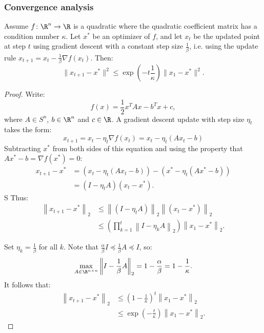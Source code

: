 \subsubsection{Convergence analysis}

\begin{theorem}
Assume $f\colon\R^n\to\R$ is a quadratic where the quadratic coefficient matrix has a condition number $\kappa$. Let $x^{*}$ be an optimizer of $f$, and let $x_{t}$ be the updated point at step $t$ using gradient descent with a constant step size $\frac{1}{\beta}$, i.e. using the update rule $x_{t+1} = x_t - \frac{1}{\beta}\nabla f(x_t)$. Then:
\begin{equation*}
\|x_{t+1} - x^*\|^2 \leq \exp\left(-t \frac{1}{\kappa}\right)\|x_1 - x^*\|^2.
\end{equation*}
\end{theorem}
\begin{proof}
Write:
\[
f(x) = \frac{1}{2}x^T A x - b^T x + c,
\]
where $A \in S^n$, $b \in \R^n$ and $c \in \R$. A gradient descent update with step size $\eta_t$ takes the form:
\[
x_{t+1} = x_t - \eta_t \nabla f(x_t) = x_t - \eta_t \left(Ax_t - b\right)
\]
Subtracting $x^*$ from both sides of this equation and using the property that $Ax^* - b = \nabla f(x^*) = 0$:
\begin{align*}
x_{t+1} - x^* &= \left(x_t - \eta_t\left(Ax_t - b\right)\right) - \left(x^* - \eta_t\left(Ax^* - b\right)\right) \\
&= (I - \eta_t A)(x_t - x^*).
\end{align*}S
Thus:
\begin{align*}
\left\|x_{t+1} - x^*\right\|_2 &\leq \left\|(I - \eta_t A)\right\|_2 \left\|(x_t - x^*)\right\|_2 \\
&\leq \left(\prod_{k=1}^t \left\| I - \eta_k A\right\|_2\right) \left\|x_1 - x^*\right\|_2.
\end{align*}

Set $\eta_k = \frac{1}{\beta}$ for all $k$. Note that $\frac{\alpha}{\beta}I \preceq \frac{1}{\beta}A \preceq I$, so:
\begin{equation*}
\max_{A \in \R^{n\times n}} \left\|I - \frac{1}{\beta} A\right \|_2 = 1 - \frac{\alpha}{\beta} = 1 - \frac{1}{\kappa}.
\end{equation*}
It follows that:
\begin{align*}
\left\|x_{t+1} - x^*\right\|_2 &\leq \left(1 - \frac{1}{\kappa}\right)^t \left\|x_1 - x^*\right\|_2 \\
&\leq \exp \left(-\frac{t}{\kappa}\right) \left\|x_1 - x^*\right\|_2.
\end{align*}
\end{proof}

